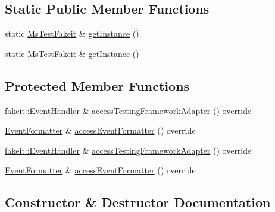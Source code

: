 \subsection*{Static Public Member Functions}
\begin{DoxyCompactItemize}
\item 
static \mbox{\hyperlink{classfakeit_1_1MsTestFakeit}{Ms\+Test\+Fakeit}} \& \mbox{\hyperlink{classfakeit_1_1MsTestFakeit_afcc31da5a006e8c523632142918eda9a}{get\+Instance}} ()
\item 
static \mbox{\hyperlink{classfakeit_1_1MsTestFakeit}{Ms\+Test\+Fakeit}} \& \mbox{\hyperlink{classfakeit_1_1MsTestFakeit_afcc31da5a006e8c523632142918eda9a}{get\+Instance}} ()
\end{DoxyCompactItemize}
\subsection*{Protected Member Functions}
\begin{DoxyCompactItemize}
\item 
\mbox{\hyperlink{structfakeit_1_1EventHandler}{fakeit\+::\+Event\+Handler}} \& \mbox{\hyperlink{classfakeit_1_1MsTestFakeit_a740fea3743adab01ac711a65b2efc2bf}{access\+Testing\+Framework\+Adapter}} () override
\item 
\mbox{\hyperlink{structfakeit_1_1EventFormatter}{Event\+Formatter}} \& \mbox{\hyperlink{classfakeit_1_1MsTestFakeit_ad4e89ab859aa132a1f35fc0fea7d05a2}{access\+Event\+Formatter}} () override
\item 
\mbox{\hyperlink{structfakeit_1_1EventHandler}{fakeit\+::\+Event\+Handler}} \& \mbox{\hyperlink{classfakeit_1_1MsTestFakeit_a740fea3743adab01ac711a65b2efc2bf}{access\+Testing\+Framework\+Adapter}} () override
\item 
\mbox{\hyperlink{structfakeit_1_1EventFormatter}{Event\+Formatter}} \& \mbox{\hyperlink{classfakeit_1_1MsTestFakeit_ad4e89ab859aa132a1f35fc0fea7d05a2}{access\+Event\+Formatter}} () override
\end{DoxyCompactItemize}


\subsection{Constructor \& Destructor Documentation}
\mbox{\label{classfakeit_1_1MsTestFakeit_ae352eaceb462fe8332c51c9d15a46ec6}} 
